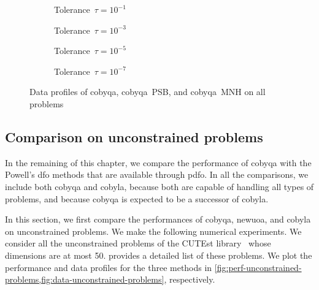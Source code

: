 \begin{figure}[ht]
    \centering
    \begin{subfigure}[b]{0.49\textwidth}
        \centering
        \caption{Tolerance~$\tau = 10^{-1}$}
    \end{subfigure}
    \hfill
    \begin{subfigure}[b]{0.49\textwidth}
        \centering
        \caption{Tolerance~$\tau = 10^{-3}$}
    \end{subfigure}
    \begin{subfigure}[b]{0.49\textwidth}
        \centering
        \caption{Tolerance~$\tau = 10^{-5}$}
    \end{subfigure}
    \hfill
    \begin{subfigure}[b]{0.49\textwidth}
        \centering
        \caption{Tolerance~$\tau = 10^{-7}$}
    \end{subfigure}
    \caption{Data profiles of \gls{cobyqa}, \gls{cobyqa}~PSB, and \gls{cobyqa}~MNH on all problems}
    \label{fig:data-models}
\end{figure}


\subsection{Comparison on unconstrained problems}

In the remaining of this chapter, we compare the performance of \gls{cobyqa} with the Powell's \gls{dfo} methods that are available through \gls{pdfo}.
In all the comparisons, we include both \gls{cobyqa} and \gls{cobyla}, because both are capable of handling all types of problems, and because \gls{cobyqa} is expected to be a successor of \gls{cobyla}.

In this section, we first compare the performances of \gls{cobyqa}, \gls{newuoa}, and \gls{cobyla} on unconstrained problems.
We make the following numerical experiments.
We consider all the unconstrained problems of the CUTEst library~\cite{Gould_Orban_Toint_2015} whose dimensions are at most \num{50}.
 provides a detailed list of these problems.
We plot the performance and data profiles for the three methods in \cref{fig:perf-unconstrained-problems,fig:data-unconstrained-problems}, respectively.

